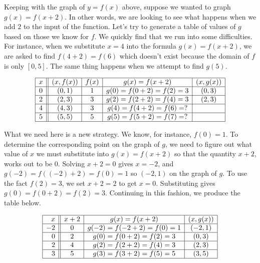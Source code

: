 Keeping with the graph of $y=f(x)$ above, suppose we wanted to graph $g(x) = f(x+2)$.  In other words, we are looking to see what happens when we add $2$ to the input of the function. Let's try to generate a table of values of $g$ based on those we know for $f$.  We quickly find that we run into some difficulties. For instance, when we substitute $x=4$ into the formula $g(x)=f(x+2)$, we are asked to find $f(4+2)=f(6)$ which doesn't exist because the domain of $f$ is only $[0,5]$.  The same thing happens when we attempt to find $g(5)$. 

\[ \begin{array}{|c||c|c|c|c|}  

\hline

x & (x,f(x)) & f(x)& g(x)=f(x+2) & (x, g(x)) \\ \hline
0  & (0,1)& 1 & g(0) = f(0+2) = f(2) = 3   &(0, 3) \\  \hline
2 & (2,3) & 3 & g(2) = f(2+2) = f(4) = 3  &(2,3) \\  \hline
4 & (4,3) & 3 &  g(4) = f(4+2) = f(6) = ? &  \\  \hline
5 & (5,5) & 5 & g(5) = f(5+2) = f(7) = ?  &  \\  \hline

\end{array} \]

 What we need here is a new strategy.  We know, for instance, $f(0) = 1$.  To determine the corresponding point on the graph of $g$, we need to figure out what value of $x$ we must substitute into $g(x) = f(x+2)$ so that the quantity $x+2$, works out to be $0$.  Solving $x+2=0$ gives $x=-2$, and $g(-2) = f((-2)+2) = f(0) = 1$ so  $(-2,1)$ on the graph of $g$.  To use the fact $f(2) = 3$, we set $x+2 = 2$ to get $x=0$. Substituting gives $g(0) = f(0+2) = f(2) = 3$. Continuing in this fashion, we produce the table below.
 
 
\[ \begin{array}{|r||c|c|c|}  

\hline

x & x+2 & g(x)=f(x+2) & (x, g(x)) \\ \hline
-2 & 0 & g(-2)=f(-2+2) = f(0) = 1   &(-2, 1) \\  \hline
0 &  2 &  g(0)=f(0+2) = f(2) = 3  &(0,3) \\  \hline
2 & 4  & g(2)=f(2+2) = f(4) = 3 &  (2,3)\\  \hline
3 & 5 & g(3)=f(3+2) = f(5) = 5  & (3,5) \\  \hline

\end{array} \]

